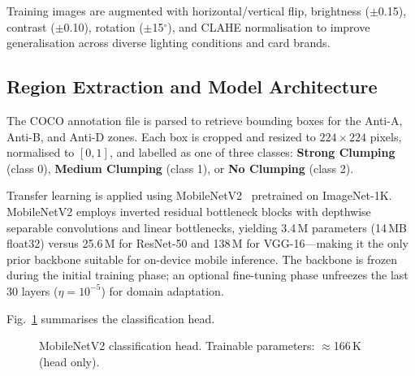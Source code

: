 \documentclass[conference]{IEEEtran}
\begin{document}
Training images are augmented with horizontal/vertical flip,
brightness ($\pm$0.15), contrast ($\pm$0.10), rotation
($\pm$15$^{\circ}$), and CLAHE normalisation to improve
generalisation across diverse lighting conditions and card brands.

\subsection{Region Extraction and Model Architecture}

The COCO annotation file is parsed to retrieve bounding boxes for
the Anti-A, Anti-B, and Anti-D zones.
Each box is cropped and resized to $224\times224$ pixels, normalised
to $[0, 1]$, and labelled as one of three classes:
\textbf{Strong Clumping} (class 0), \textbf{Medium Clumping}
(class 1), or \textbf{No Clumping} (class 2).

Transfer learning is applied using MobileNetV2~\cite{sandler2018}
pretrained on ImageNet-1K.
MobileNetV2 employs inverted residual bottleneck blocks with
depthwise separable convolutions and linear bottlenecks, yielding
3.4\,M parameters (14\,MB float32) versus 25.6\,M for ResNet-50
and 138\,M for VGG-16---making it the only prior backbone suitable
for on-device mobile inference.
The backbone is frozen during the initial training phase; an
optional fine-tuning phase unfreezes the last 30 layers
($\eta{=}10^{-5}$) for domain adaptation.

Fig.~\ref{fig:arch} summarises the classification head.

\begin{figure}[htbp]
  \centering
  \caption{MobileNetV2 classification head.
           Trainable parameters: $\approx$166\,K (head only).}
  \label{fig:arch}
\end{figure}
\end{document}
